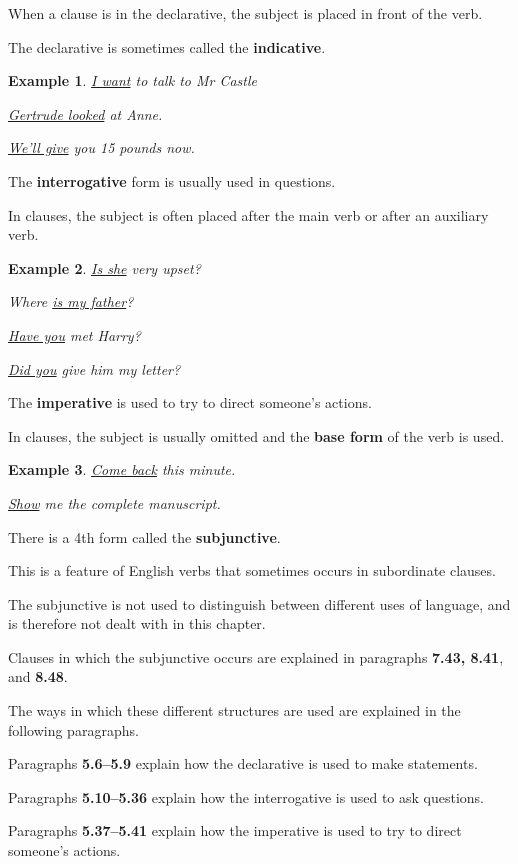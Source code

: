 \documentclass[oneside]{book}
\numberwithin{equation}{section}
\newtheorem{example}{Example}[section]
\begin{document}
When a clause is in the declarative, the subject is placed in front of the verb.

%
The declarative is sometimes called the \textbf{indicative}.
\begin{example}
    \underline{I want} to talk to Mr Castle
    
    \underline{Gertrude looked} at Anne.
    
    \underline{We'll give} you 15 pounds now.
\end{example}
The \textbf{interrogative} form is usually used in questions.

In clauses, the subject is often placed after the main verb or after an auxiliary verb.
\begin{example}
    \underline{Is she} very upset?
    
    Where \underline{is my father}?
    
    \underline{Have you} met Harry?
    
    \underline{Did you} give him my letter?
\end{example}
The \textbf{imperative} is used to try to direct someone's actions.

In clauses, the subject is usually omitted and the \textbf{base form} of the verb is used.
\begin{example}
    \underline{Come back} this minute.
    
    \underline{Show} me the complete manuscript.
\end{example}
There is a 4th form called the \textbf{subjunctive}.

This is a feature of English verbs that sometimes occurs in subordinate clauses.

The subjunctive is not used to distinguish between different uses of language, and is therefore not dealt with in this chapter.

Clauses in which the subjunctive occurs are explained in paragraphs \textbf{7.43, 8.41}, and \textbf{8.48}.

%
\noindent{} The ways in which these different structures are used are explained in the following paragraphs.

%
Paragraphs \textbf{5.6--5.9} explain how the declarative is used to make statements.

%
Paragraphs \textbf{5.10--5.36} explain how the interrogative is used to ask questions.

%
Paragraphs \textbf{5.37--5.41} explain how the imperative is used to try to direct someone's actions.
\end{document}
